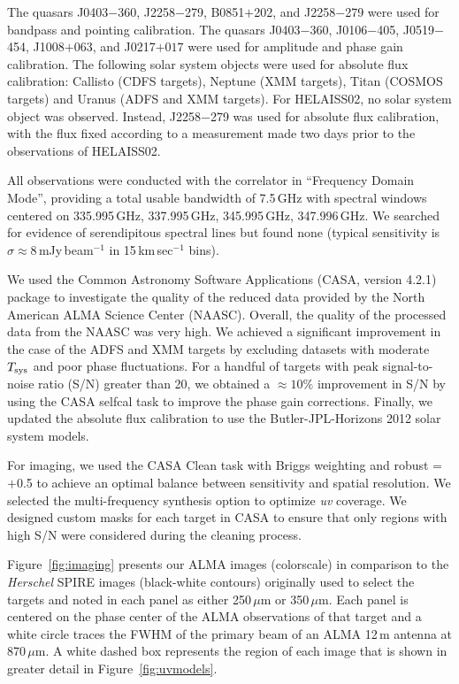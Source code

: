 \documentclass[iop]{emulateapj}
\begin{document}
The quasars J0403$-$360, J2258$-$279, B0851$+$202, and J2258$-$279 were used
for bandpass and pointing calibration.  The quasars J0403$-$360, J0106$-$405,
J0519$-$454, J1008$+$063, and J0217$+017$ were used for amplitude and phase
gain calibration.  The following solar system objects were used for absolute
flux calibration: Callisto (CDFS targets), Neptune (XMM targets), Titan (COSMOS
targets) and Uranus (ADFS and XMM targets).  For HELAISS02, no solar system
object was observed.  Instead, J2258$-$279 was used for absolute flux
calibration, with the flux fixed according to a measurement made two days prior
to the observations of HELAISS02.

All observations were conducted with the correlator in ``Frequency Domain
Mode'', providing a total usable bandwidth of 7.5$\,$GHz with spectral windows
centered on 335.995$\,$GHz, 337.995$\,$GHz, 345.995$\,$GHz, 347.996$\,$GHz.  We
searched for evidence of serendipitous spectral lines but found none (typical
sensitivity is $\sigma \approx 8\,$mJy$\,$beam$^{-1}$ in 15$\,$km$\,$sec$^{-1}$
bins).

We used the Common Astronomy Software Applications (CASA, version 4.2.1)
package to investigate the quality of the reduced data provided by the North
American ALMA Science Center (NAASC).  Overall, the quality of the processed
data from the NAASC was very high.  We achieved a significant improvement in
the case of the ADFS and XMM targets by excluding datasets with moderate
$T_{\rm sys}$ and poor phase fluctuations.  For a handful of targets with peak
signal-to-noise ratio (S/N) greater than 20, we obtained a $\approx 10\%$
improvement in S/N by using the CASA {\sc selfcal} task to improve the phase
gain corrections.  Finally, we updated the absolute flux calibration to use the
Butler-JPL-Horizons 2012 solar system models.

For imaging, we used the CASA {\sc Clean} task with Briggs weighting and robust
= $+$0.5 to achieve an optimal balance between sensitivity and spatial
resolution.  We selected the multi-frequency synthesis option to optimize {\it
uv} coverage.  We designed custom masks for each target in CASA to ensure that
only regions with high S/N were considered during the cleaning process.

Figure~\ref{fig:imaging} presents our ALMA images (colorscale) in comparison to
the {\it Herschel} SPIRE images (black-white contours) originally used to
select the targets and noted in each panel as either 250$\,\mu$m or
350$\,\mu$m.  Each panel is centered on the phase center of the ALMA
observations of that target and a white circle traces the FWHM of the primary
beam of an ALMA 12$\,$m antenna at 870$\,\mu$m.  A white dashed box represents
the region of each image that is shown in greater detail in
Figure~\ref{fig:uvmodels}.
\end{document}
